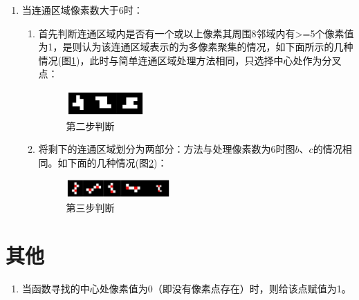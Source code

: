 \documentclass[12pt]{article}
\begin{document}
\begin{enumerate}
\begin{enumerate}
\item 当连通区域像素数大于6时：
\begin{enumerate}
\item 首先判断连通区域内是否有一个或以上像素其周围8邻域内有>=5个像素值为1，是则认为该连通区域表示的为多像素聚集的情况，如下面所示的几种情况(图\ref{fig:complex3})，此时与简单连通区域处理方法相同，只选择中心处作为分叉点：
\begin{figure}[ht!]
\centering
\includegraphics[width=0.3\textwidth]{images/complex3}
\caption{第二步判断}
\label{fig:complex3}
\end{figure}
\item 将剩下的连通区域划分为两部分：方法与处理像素数为6时图$b$、$c$的情况相同。如下面的几种情况(图\ref{fig:complex4})：
\begin{figure}[ht!]
\centering
\includegraphics[width=0.4\textwidth]{images/complex4}
\caption{第三步判断}
\label{fig:complex4}
\end{figure}
\end{enumerate}
\end{enumerate}
\end{enumerate}

\section{其他}
\begin{enumerate}
\item 当函数寻找的中心处像素值为0（即没有像素点存在）时，则给该点赋值为1。
\end{enumerate}
\end{document}
